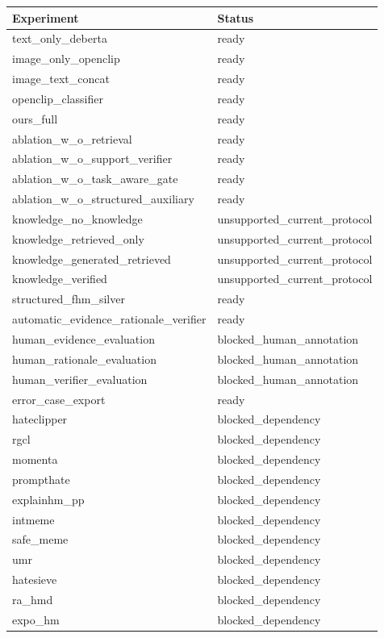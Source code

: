\begin{tabular}{ll}
\toprule
Experiment & Status \\
\midrule
text\_only\_deberta & ready \\
image\_only\_openclip & ready \\
image\_text\_concat & ready \\
openclip\_classifier & ready \\
ours\_full & ready \\
ablation\_w\_o\_retrieval & ready \\
ablation\_w\_o\_support\_verifier & ready \\
ablation\_w\_o\_task\_aware\_gate & ready \\
ablation\_w\_o\_structured\_auxiliary & ready \\
knowledge\_no\_knowledge & unsupported\_current\_protocol \\
knowledge\_retrieved\_only & unsupported\_current\_protocol \\
knowledge\_generated\_retrieved & unsupported\_current\_protocol \\
knowledge\_verified & unsupported\_current\_protocol \\
structured\_fhm\_silver & ready \\
automatic\_evidence\_rationale\_verifier & ready \\
human\_evidence\_evaluation & blocked\_human\_annotation \\
human\_rationale\_evaluation & blocked\_human\_annotation \\
human\_verifier\_evaluation & blocked\_human\_annotation \\
error\_case\_export & ready \\
hateclipper & blocked\_dependency \\
rgcl & blocked\_dependency \\
momenta & blocked\_dependency \\
prompthate & blocked\_dependency \\
explainhm\_pp & blocked\_dependency \\
intmeme & blocked\_dependency \\
safe\_meme & blocked\_dependency \\
umr & blocked\_dependency \\
hatesieve & blocked\_dependency \\
ra\_hmd & blocked\_dependency \\
expo\_hm & blocked\_dependency \\
\bottomrule
\end{tabular}
